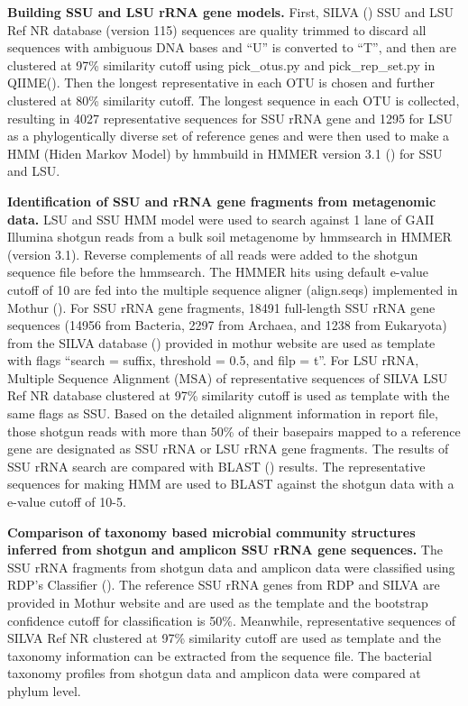 \documentclass[12pt]{article}
\begin{document}
  {\bf Building SSU and LSU rRNA gene models. }
First, SILVA (\cite{silva2013}) SSU and LSU Ref NR database (version 115) sequences are quality trimmed to discard all sequences with ambiguous DNA bases and ``U'' is converted to ``T'', and then are clustered at 97\% similarity cutoff using pick\_otus.py and pick\_rep\_set.py in QIIME(\cite{qiime}). Then the longest representative in each OTU is chosen and further clustered at 80\% similarity cutoff. The longest sequence in each OTU is collected, resulting in 4027 representative sequences for SSU rRNA gene and 1295 for LSU as a phylogentically diverse set of reference genes and were then used to make a HMM (Hiden Markov Model) by hmmbuild in HMMER version 3.1 (\cite{hmmer3}) for SSU and LSU.

  {\bf Identification of SSU and rRNA gene fragments from metagenomic data. }
LSU and SSU HMM model were used to search against 1 lane of GAII Illumina shotgun reads from a bulk soil metagenome by hmmsearch in HMMER (version 3.1). Reverse complements of all reads were added to the shotgun sequence file before the hmmsearch. The HMMER hits using default e-value cutoff of 10 are fed into the multiple sequence aligner (align.seqs) implemented in Mothur (\cite{mothuraligner2009}). For SSU rRNA gene fragments, 18491 full-length SSU rRNA gene sequences (14956 from Bacteria, 2297 from Archaea, and 1238 from Eukaryota) from the SILVA database (\cite{silva2013}) provided in mothur website are used as template with flags ``search = suffix, threshold = 0.5, and filp = t''.  For LSU rRNA, Multiple Sequence Alignment (MSA) of representative sequences of SILVA LSU Ref NR database clustered at 97\% similarity cutoff is used as template with the same flags as SSU. Based on the detailed alignment information in report file, those shotgun reads with more than 50\% of their basepairs mapped to a reference gene are designated as SSU rRNA or LSU rRNA gene fragments. The results of SSU rRNA search are compared with BLAST (\cite{blast}) results. The representative sequences for making HMM are used to BLAST against the shotgun data with a e-value cutoff of 10-5.

  {\bf Comparison of taxonomy based microbial community structures inferred from shotgun and amplicon SSU rRNA gene sequences. }
The SSU rRNA fragments from shotgun data and amplicon data were classified using RDP’s Classifier (\cite{rdpclassifier}). The reference SSU rRNA genes from RDP and SILVA are provided in Mothur website and are used as the template and the bootstrap confidence cutoff for classification is 50\%. Meanwhile, representative sequences of SILVA Ref NR clustered at 97\% similarity cutoff are used as template and the taxonomy information can be extracted from the sequence file. The bacterial taxonomy profiles from shotgun data and amplicon data were compared at phylum level.
\end{document}
